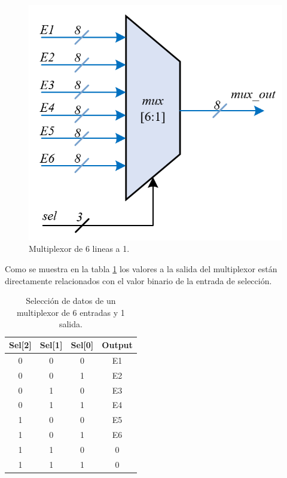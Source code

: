 \documentclass[9pt,technote]{IEEEtran}
\begin{document}
	\begin{figure}[htb]
		\centering
		\includegraphics[scale=.3]{MUX61.png}
		\caption{Multiplexor de 6 lineas a 1.}
		\label{fig:MUX6:1}
	\end{figure}
		
	Como se muestra en la tabla \ref{Tabla:MUX6_VAL:1} los valores a la salida del multiplexor están directamente relacionados con el valor binario de la entrada de selección.
	
	
	
	\begin{table}[htb]
		\centering
		\begin{tabular}{|c|c|c|c|} 
			\hline
			Sel[2] & Sel[1] & Sel[0] & Output \\ [0.5ex] 
			\hline\hline
			0 & 0 & 0 & E1 \\ 
			\hline
			0 & 0 & 1 & E2 \\
			\hline
			0 & 1 & 0 & E3 \\
			\hline
			0 & 1 & 1 & E4 \\
			\hline
			1 & 0 & 0 & E5 \\
			\hline
			1 & 0 & 1 & E6 \\
			\hline
			1 & 1 & 0 & 0 \\
			\hline
			1 & 1 & 1 & 0 \\ [1ex] 
			\hline
		\end{tabular}
		\caption{Selección de datos de un multiplexor de 6 entradas y 1 salida.}
		\label{Tabla:MUX6_VAL:1}
	\end{table}
	
\end{document}
